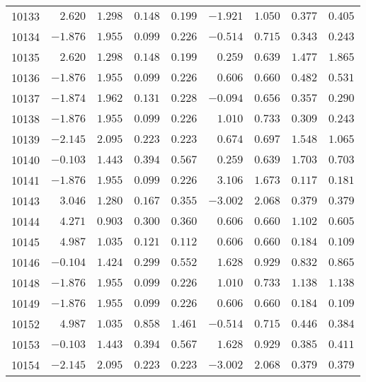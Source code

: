 \documentclass[6pt]{article}
\begin{document}
\begin{landscape}
{\begin{longtable}{lrrrrrrrr}
10133&$ 2.620$&$1.298$&$0.148$&$0.199$&$-1.921$&$1.050$&$0.377$&$0.405$\tabularnewline
10134&$-1.876$&$1.955$&$0.099$&$0.226$&$-0.514$&$0.715$&$0.343$&$0.243$\tabularnewline
10135&$ 2.620$&$1.298$&$0.148$&$0.199$&$ 0.259$&$0.639$&$1.477$&$1.865$\tabularnewline
10136&$-1.876$&$1.955$&$0.099$&$0.226$&$ 0.606$&$0.660$&$0.482$&$0.531$\tabularnewline
10137&$-1.874$&$1.962$&$0.131$&$0.228$&$-0.094$&$0.656$&$0.357$&$0.290$\tabularnewline
10138&$-1.876$&$1.955$&$0.099$&$0.226$&$ 1.010$&$0.733$&$0.309$&$0.243$\tabularnewline
10139&$-2.145$&$2.095$&$0.223$&$0.223$&$ 0.674$&$0.697$&$1.548$&$1.065$\tabularnewline
10140&$-0.103$&$1.443$&$0.394$&$0.567$&$ 0.259$&$0.639$&$1.703$&$0.703$\tabularnewline
10141&$-1.876$&$1.955$&$0.099$&$0.226$&$ 3.106$&$1.673$&$0.117$&$0.181$\tabularnewline
10143&$ 3.046$&$1.280$&$0.167$&$0.355$&$-3.002$&$2.068$&$0.379$&$0.379$\tabularnewline
10144&$ 4.271$&$0.903$&$0.300$&$0.360$&$ 0.606$&$0.660$&$1.102$&$0.605$\tabularnewline
10145&$ 4.987$&$1.035$&$0.121$&$0.112$&$ 0.606$&$0.660$&$0.184$&$0.109$\tabularnewline
10146&$-0.104$&$1.424$&$0.299$&$0.552$&$ 1.628$&$0.929$&$0.832$&$0.865$\tabularnewline
10148&$-1.876$&$1.955$&$0.099$&$0.226$&$ 1.010$&$0.733$&$1.138$&$1.138$\tabularnewline
10149&$-1.876$&$1.955$&$0.099$&$0.226$&$ 0.606$&$0.660$&$0.184$&$0.109$\tabularnewline
10152&$ 4.987$&$1.035$&$0.858$&$1.461$&$-0.514$&$0.715$&$0.446$&$0.384$\tabularnewline
10153&$-0.103$&$1.443$&$0.394$&$0.567$&$ 1.628$&$0.929$&$0.385$&$0.411$\tabularnewline
10154&$-2.145$&$2.095$&$0.223$&$0.223$&$-3.002$&$2.068$&$0.379$&$0.379$\tabularnewline
\hline
\end{longtable}}\end{landscape}
\end{document}
